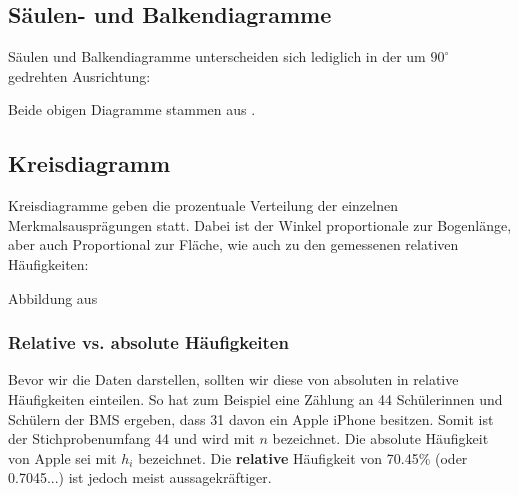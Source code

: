 \subsection{Säulen- und
  Balkendiagramme}
Säulen und Balkendiagramme unterscheiden sich lediglich in der um $90^\circ$ gedrehten Ausrichtung:
\begin{center}
\end{center}
Beide obigen Diagramme stammen aus \cite{marthaler21}.

\subsection{Kreisdiagramm}
Kreisdiagramme geben die prozentuale Verteilung der einzelnen Merkmalsausprägungen statt. Dabei ist der Winkel proportionale zur Bogenlänge, aber auch Proportional zur Fläche, wie auch zu den gemessenen relativen Häufigkeiten:


Abbildung aus \cite{marthaler21}
\newpage

\subsubsection{Relative vs. absolute Häufigkeiten}

Bevor wir die Daten darstellen, sollten wir diese von absoluten in
relative Häufigkeiten einteilen. So hat zum Beispiel eine Zählung an
44 Schülerinnen und Schülern der BMS ergeben, dass 31 davon ein Apple
iPhone besitzen. Somit ist der Stichprobenumfang 44 und wird mit $n$
bezeichnet. Die absolute Häufigkeit von Apple sei mit $h_i$
bezeichnet. Die \textbf{relative} Häufigkeit von 70.45\% (oder 0.7045...) ist
jedoch meist aussagekräftiger.

